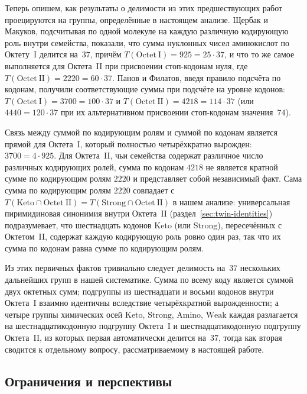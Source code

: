 \documentclass[11pt,a4paper]{article}
\renewcommand{\_}{\origunderscore\allowbreak}
\begin{document}
Теперь опишем, как результаты о делимости из этих
предшествующих работ проецируются на группы,
определённые в настоящем анализе. Щербак и Макуков,
подсчитывая по одной молекуле на каждую различную
кодирующую роль внутри семейства, показали, что
сумма нуклонных чисел аминокислот по
Октету~I делится на~$37$, причём
$T(\mathrm{Octet~I}) = 925 = 25 \cdot 37$,
и что то же самое выполняется для
Октета~II при присвоении стоп-кодонам
нуля, где
$T(\mathrm{Octet~II}) = 2220 = 60 \cdot 37$.
Панов и Филатов, введя правило подсчёта по кодонам,
получили соответствующие суммы при подсчёте на
уровне кодонов:
$T(\mathrm{Octet~I}) = 3700 = 100 \cdot 37$
и $T(\mathrm{Octet~II}) = 4218 = 114 \cdot
37$ (или $4440 = 120 \cdot 37$ при их альтернативном
присвоении стоп-кодонам значения~$74$).

Связь между суммой по кодирующим ролям и суммой по
кодонам является прямой для
Октета~I, который полностью
четырёхкратно вырожден:
$3700 = 4 \cdot 925$. Для
Октета~II, чьи семейства содержат
различное число различных кодирующих ролей,
сумма по кодонам $4218$ не является кратной сумме по
кодирующим ролям $2220$ и представляет собой
независимый факт. Сама сумма по кодирующим ролям
$2220$ совпадает с
$T(\mathrm{Keto} \cap
\mathrm{Octet~II}) = T(\mathrm{Strong} \cap
\mathrm{Octet~II})$ в нашем анализе:
универсальная пиримидиновая синонимия внутри
Октета~II
(раздел~\ref{sec:twin-identities})
подразумевает, что шестнадцать кодонов
$\mathrm{Keto}$ (или $\mathrm{Strong}$),
пересечённых с Октетом~II,
содержат каждую кодирующую роль ровно один раз,
так что их сумма по кодонам равна сумме по
кодирующим ролям.

Из этих первичных фактов тривиально следует
делимость на~$37$ нескольких дальнейших групп в
нашей систематике. Сумма по всему коду является
суммой двух октетных сумм; подгруппы из шестнадцати
и восьми кодонов внутри
Октета~I взаимно идентичны
вследствие четырёхкратной вырожденности; а четыре
группы химических осей $\mathrm{Keto}$,
$\mathrm{Strong}$, $\mathrm{Amino}$, $\mathrm{Weak}$
каждая разлагается на шестнадцатикодонную подгруппу
Октета~I и шестнадцатикодонную
подгруппу Октета~II, из которых
первая автоматически делится на~$37$, тогда как
вторая сводится к отдельному вопросу,
рассматриваемому в настоящей работе.

\subsection{Ограничения и перспективы}
\label{sec:discussion-limitations}
\end{document}
